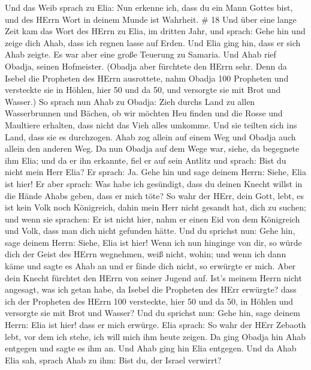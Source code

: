 Und das Weib sprach zu Elia: Nun erkenne ich, dass du ein Mann Gottes
bist, und des HErrn Wort in deinem Munde ist Wahrheit. \# 18
 Und über eine lange Zeit kam das Wort des HErrn zu Elia, im
dritten Jahr, und sprach: Gehe hin und zeige dich Ahab, dass ich regnen
lasse auf Erden.  Und Elia ging hin, dass er sich Ahab
zeigte. Es war aber eine große Teuerung zu Samaria.  Und
Ahab rief Obadja, seinen Hofmeister. (Obadja aber fürchtete den HErrn
sehr.  Denn da Isebel die Propheten des HErrn ausrottete,
nahm Obadja 100 Propheten und versteckte sie in Höhlen, hier 50 und da
50, und versorgte sie mit Brot und Wasser.)  So sprach nun
Ahab zu Obadja: Zieh durchs Land zu allen Wasserbrunnen und Bächen, ob
wir möchten Heu finden und die Rosse und Maultiere erhalten, dass nicht
das Vieh alles umkomme.  Und sie teilten sich ins Land, dass
sie es durchzogen. Ahab zog allein auf einem Weg und Obadja auch allein
den anderen Weg.  Da nun Obadja auf dem Wege war, siehe, da
begegnete ihm Elia; und da er ihn erkannte, fiel er auf sein Antlitz und
sprach: Bist du nicht mein Herr Elia?  Er sprach: Ja. Gehe
hin und sage deinem Herrn: Siehe, Elia ist hier!  Er aber
sprach: Was habe ich gesündigt, dass du deinen Knecht willst in die
Hände Ahabs geben, dass er mich töte?  So wahr der HErr,
dein Gott, lebt, es ist kein Volk noch Königreich, dahin mein Herr nicht
gesandt hat, dich zu suchen; und wenn sie sprachen: Er ist nicht hier,
nahm er einen Eid von dem Königreich und Volk, dass man dich nicht
gefunden hätte.  Und du sprichst nun: Gehe hin, sage deinem
Herrn: Siehe, Elia ist hier!  Wenn ich nun hinginge von
dir, so würde dich der Geist des HErrn wegnehmen, weiß nicht, wohin; und
wenn ich dann käme und sagte es Ahab an und er fände dich nicht, so
erwürgte er mich. Aber dein Knecht fürchtet den HErrn von seiner Jugend
auf.  Ist's meinem Herrn nicht angesagt, was ich getan
habe, da Isebel die Propheten des HErr erwürgte? dass ich der Propheten
des HErrn 100 versteckte, hier 50 und da 50, in Höhlen und versorgte sie
mit Brot und Wasser?  Und du sprichst nun: Gehe hin, sage
deinem Herrn: Elia ist hier! dass er mich erwürge.  Elia
sprach: So wahr der HErr Zebaoth lebt, vor dem ich stehe, ich will mich
ihm heute zeigen.  Da ging Obadja hin Ahab entgegen und
sagte es ihm an. Und Ahab ging hin Elia entgegen.  Und da
Ahab Elia sah, sprach Ahab zu ihm: Bist du, der Israel verwirrt?
